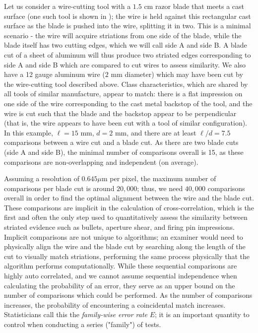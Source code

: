 \documentclass[9pt,twocolumn,twoside]{pnas-new}\usepackage[]{graphicx}\usepackage[dvipsnames]{xcolor}
\begin{document}
Let us consider a wire-cutting tool with a $1.5$ cm razor blade that meets a cast surface (one such tool is shown in ); the wire is held against this rectangular cast surface as the blade is pushed into the wire, splitting it in two.
This is a minimal scenario - the wire will acquire striations from one side of the blade, while the blade itself has two cutting edges, which we will call side A and side B.
A blade cut of a sheet of aluminum will thus produce two striated edges corresponding to side A and side B which are compared to cut wires to assess similarity.
We also have a 12 gauge aluminum wire ($2$ mm diameter) which may have been cut by the wire-cutting tool described above.
Class characteristics, which are shared by all tools of similar manufacture, appear to match:
there is a flat impression on one side of the wire corresponding to the cast metal backstop of the tool,
and the wire is cut such that the blade and the backstop appear to be perpendicular
(that is, the wire appears to have been cut with a tool of similar configuration).
In this example, $\ell = 15$ mm, $d = 2$ mm, and there are at least $\ell/d = 7.5$ comparisons between a wire cut and a blade cut.
As there are two blade cuts (side A and side B), the minimal number of comparisons overall is 15, as these comparisons are non-overlapping and independent (on average).

Assuming a resolution of $0.645 \mu$m per pixel, the maximum number of comparisons per blade cut is around $20,000$; thus, we need $40,000$ comparisons overall in order to find the optimal alignment between the wire and the blade cut.
These comparisons are implicit in the calculation of cross-correlation, which is the first and often the only step used to quantitatively assess the similarity between striated evidence such as bullets, aperture shear, and firing pin impressions.
Implicit comparisons are not unique to algorithms; an examiner would need to physically align the wire and the blade cut by searching along the length of the cut to visually match striations, performing the same process physically that the algorithm performs computationally.
While these sequential comparisons are highly auto correlated, and we cannot assume sequential independence when calculating the probability of an error, they serve as an upper bound on the number of comparisons which could be performed.
As the number of comparisons increases, the probability of encountering a coincidental match increases.
Statisticians call this the \textit{family-wise error rate} $E$; it is an important quantity to control when conducting a series ("family") of tests.
\end{document}
